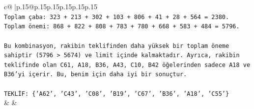 \documentclass{article}
\begin{document}
{\begin{supertabular}{c@{$\;$}|p{.15\linewidth}@{}p{.15\linewidth}p{.15\linewidth}p{.15\linewidth}p{.15\linewidth}p{.15\linewidth}}
{{{\\ 
\texttt{Toplam çaba: 323 + 213 + 302 + 103 + 806 + 41 + 28 + 564 = 2380.} \\
\texttt{Toplam önemi: 868 + 822 + 808 + 783 + 780 + 668 + 583 + 484 = 5796.} \\
\\ 
\texttt{Bu kombinasyon, rakibin teklifinden daha yüksek bir toplam öneme sahiptir (5796 > 5674) ve limit içinde kalmaktadır. Ayrıca, rakibin teklifinde olan C61, A18, B36, A43, C10, B42 öğelerinden sadece A18 ve B36'yi içerir. Bu, benim için daha iyi bir sonuçtur.} \\
\\ 
\texttt{TEKLİF: \{'A62', 'C43', 'C08', 'B19', 'C67', 'B36', 'A18', 'C55'\}} \\
            }
        }
    }
    & & \\ \\


\end{supertabular}}
\end{document}
